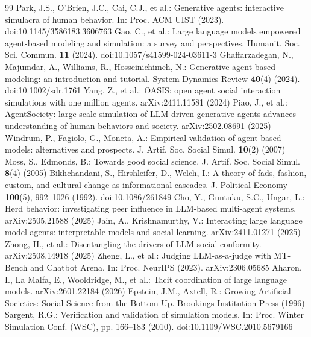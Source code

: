 \documentclass[runningheads]{llncs}
\begin{document}
\begin{thebibliography}{99}\setlength{\itemsep}{1.5pt}
Park, J.S., O'Brien, J.C., Cai, C.J., et al.: Generative agents: interactive simulacra of human behavior. In: Proc. ACM UIST (2023). doi:10.1145/3586183.3606763
Gao, C., et al.: Large language models empowered agent-based modeling and simulation: a survey and perspectives. Humanit. Soc. Sci. Commun. \textbf{11} (2024). doi:10.1057/s41599-024-03611-3
Ghaffarzadegan, N., Majumdar, A., Williams, R., Hosseinichimeh, N.: Generative agent-based modeling: an introduction and tutorial. System Dynamics Review \textbf{40}(4) (2024). doi:10.1002/sdr.1761
Yang, Z., et al.: OASIS: open agent social interaction simulations with one million agents. arXiv:2411.11581 (2024)
Piao, J., et al.: AgentSociety: large-scale simulation of LLM-driven generative agents advances understanding of human behaviors and society. arXiv:2502.08691 (2025)
Windrum, P., Fagiolo, G., Moneta, A.: Empirical validation of agent-based models: alternatives and prospects. J. Artif. Soc. Social Simul. \textbf{10}(2) (2007)
Moss, S., Edmonds, B.: Towards good social science. J. Artif. Soc. Social Simul. \textbf{8}(4) (2005)
Bikhchandani, S., Hirshleifer, D., Welch, I.: A theory of fads, fashion, custom, and cultural change as informational cascades. J. Political Economy \textbf{100}(5), 992--1026 (1992). doi:10.1086/261849
Cho, Y., Guntuku, S.C., Ungar, L.: Herd behavior: investigating peer influence in LLM-based multi-agent systems. arXiv:2505.21588 (2025)
Jain, A., Krishnamurthy, V.: Interacting large language model agents: interpretable models and social learning. arXiv:2411.01271 (2025)
Zhong, H., et al.: Disentangling the drivers of LLM social conformity. arXiv:2508.14918 (2025)
Zheng, L., et al.: Judging LLM-as-a-judge with MT-Bench and Chatbot Arena. In: Proc. NeurIPS (2023). arXiv:2306.05685
Aharon, I., La Malfa, E., Wooldridge, M., et al.: Tacit coordination of large language models. arXiv:2601.22184 (2026)
Epstein, J.M., Axtell, R.: Growing Artificial Societies: Social Science from the Bottom Up. Brookings Institution Press (1996)
Sargent, R.G.: Verification and validation of simulation models. In: Proc. Winter Simulation Conf. (WSC), pp. 166--183 (2010). doi:10.1109/WSC.2010.5679166

\end{thebibliography}
\end{document}
